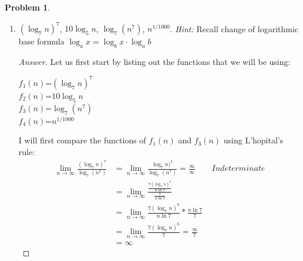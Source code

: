 \documentclass[11pt]{article}
\theoremstyle{definition}
\theoremstyle{definition}
\newtheorem{required}{Problem}
\theoremstyle{definition}
\begin{document}
\begin{required}
\begin{enumerate} [label=(\alph*)]
\begin{proof}[Answer]
We do not know whether $f_2(n)$ or $f_4(n)$ grows faster than each other so we will compare the two functions to each other using L'hopital's rule: \\
\begin{align*}
\lim_{n \to \infty} \frac{n+1000000}{\frac{n^2}{\sqrt{n}}} &= \lim_{n \to \infty} \frac{n+1000000}{n^{3/2}}  = \frac{\infty}{\infty} \qquad Indeterminate  \\
&= \lim_{n \to \infty} \frac{1}{\frac{3}{2}n^{\frac{1}{2}}}  = \frac{1}{\infty}\\
&= 0.
\end{align*} 
We can see from the above that $f_4(n)$ will grow faster than $f_2(n)$, such that $f_2(n) \in O(f_4(n))$. This shows that $f_4(n)$ will be an upper bound of $f_2(n)$. Thus, $f_4(n) \in \Omega(f_2(n))$, which is the lower bound. \\

Out of our set of functions we see that:
\begin{center}
$f_2(n)$, $f_4(n)$, $f_1(n)$, $f_3(n)$
\end{center}
The functions above are sorted from the slowest to the fastest growth rates. \\


\end{proof}

\newpage
\subsection{Problem 12\ref{1b}}
    \item \label{1b} $ (\log_7 n)^7 $, \qquad $10 \log_5 n$, \qquad $\log_7 (n^7)$, \qquad $n^{1/1000}$.
    \emph{Hint:} Recall change of logarithmic base formula $\log_a x = \log_b x\cdot\log_a b$
    \begin{proof}[Answer]
Let us first start by listing out the functions that we will be using:
\begin{center}
$f_1(n)$=$ (\log_7 n)^7 $ \\
$f_2(n)$=$10 \log_5 n$ \\
$f_3(n)$=$\log_7 (n^7)$ \\
$f_4(n)$=$n^{1/1000}$ \\
\end{center}

I will first compare the functions of $f_1(n)$ and $f_3(n)$ using L'hopital's rule:
\begin{align*}
\lim_{n \to \infty} \frac{(\log_7 n)^7}{\log_7 (n^{7})} &= \lim_{n \to \infty} \frac{\log_7 n)^7}{\log_7 (n^{7})}  = \frac{\infty}{\infty} \qquad Indeterminate  \\
&= \lim_{n \to \infty} \frac{\frac{7(\log_7 n)^6}{n\ln7}}{\frac{7}{n\ln7}}\\
&= \lim_{n \to \infty} \frac{7(\log_7 n)^6}{n\ln7} * \frac{n\ln7}{7} \\
&= \lim_{n \to \infty} \frac{7(\log_7 n)^6}{7} = \frac{\infty}{7}\\
&= \infty
\end{align*} 


\end{proof}
\end{enumerate}
\end{required}
\end{document}
